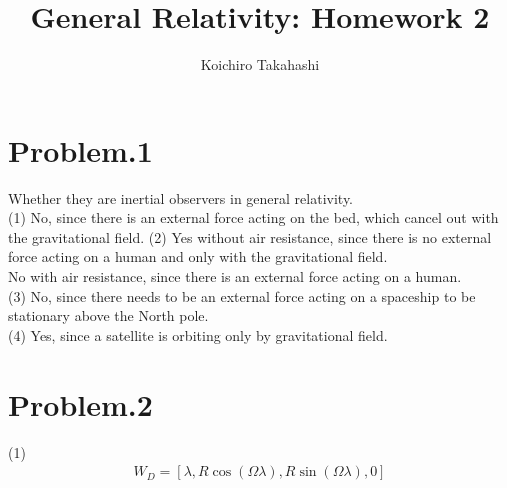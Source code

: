 \documentclass[12pt]{article}
\begin{document}
\title{General Relativity: Homework 2}
\author{Koichiro Takahashi}
\maketitle

\section*{Problem.1}
Whether they are inertial observers in general relativity.\\
(1) No, since there is an external force acting on the bed, which cancel out with the gravitational field. 
(2) Yes without air resistance, since there is no external force acting on a human and only with the gravitational field.\\
No with air resistance, since there is an external force acting on a human.\\
(3) No, since there needs to be an external force acting on a spaceship to be stationary above the North pole.\\
(4) Yes, since a satellite is orbiting only by gravitational field.
\section*{Problem.2}
(1)
\begin{align*}
W_D = \left[\lambda, R \cos(\Omega \lambda), R \sin(\Omega \lambda), 0\right]
\end{align*}
\end{document}
